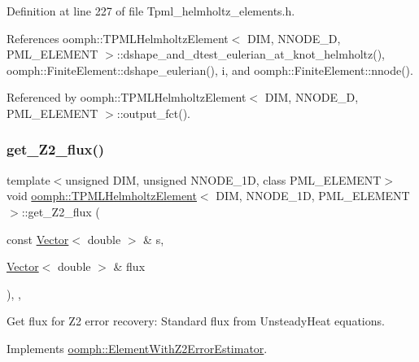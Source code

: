 Definition at line 227 of file Tpml\+\_\+helmholtz\+\_\+elements.\+h.



References oomph\+::\+T\+P\+M\+L\+Helmholtz\+Element$<$ D\+I\+M, N\+N\+O\+D\+E\+\_\+D, P\+M\+L\+\_\+\+E\+L\+E\+M\+E\+N\+T $>$\+::dshape\+\_\+and\+\_\+dtest\+\_\+eulerian\+\_\+at\+\_\+knot\+\_\+helmholtz(), oomph\+::\+Finite\+Element\+::dshape\+\_\+eulerian(), i, and oomph\+::\+Finite\+Element\+::nnode().



Referenced by oomph\+::\+T\+P\+M\+L\+Helmholtz\+Element$<$ D\+I\+M, N\+N\+O\+D\+E\+\_\+D, P\+M\+L\+\_\+\+E\+L\+E\+M\+E\+N\+T $>$\+::output\+\_\+fct().

\mbox{\label{classoomph_1_1TPMLHelmholtzElement_ad1aa55239d94cbe000bf6645330d4722}} 
\subsubsection{\texorpdfstring{get\+\_\+\+Z2\+\_\+flux()}{get\_Z2\_flux()}}
{\footnotesize\ttfamily template$<$unsigned D\+IM, unsigned N\+N\+O\+D\+E\+\_\+1D, class P\+M\+L\+\_\+\+E\+L\+E\+M\+E\+NT$>$ \\
void \hyperlink{classoomph_1_1TPMLHelmholtzElement}{oomph\+::\+T\+P\+M\+L\+Helmholtz\+Element}$<$ D\+IM, N\+N\+O\+D\+E\+\_\+1D, P\+M\+L\+\_\+\+E\+L\+E\+M\+E\+NT $>$\+::get\+\_\+\+Z2\+\_\+flux (\begin{DoxyParamCaption}\item[{const \hyperlink{classoomph_1_1Vector}{Vector}$<$ double $>$ \&}]{s,  }\item[{\hyperlink{classoomph_1_1Vector}{Vector}$<$ double $>$ \&}]{flux }\end{DoxyParamCaption})\hspace{0.3cm}{\ttfamily [inline]}, {\ttfamily [protected]}, {\ttfamily [virtual]}}



Get \textquotesingle{}flux\textquotesingle{} for Z2 error recovery\+: Standard flux from Unsteady\+Heat equations. 



Implements \hyperlink{classoomph_1_1ElementWithZ2ErrorEstimator_a5688ff5f546d81771cabad82ca5a7556}{oomph\+::\+Element\+With\+Z2\+Error\+Estimator}.



